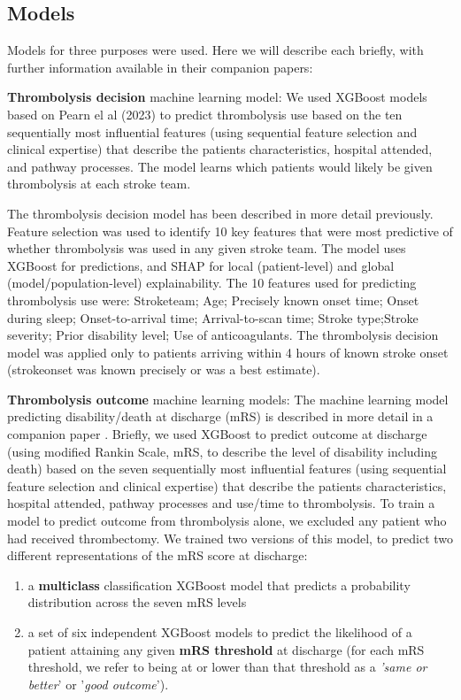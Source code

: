\subsection{Models}

Models for three purposes were used. Here we will describe each briefly, with further information available in their companion papers:

\textbf{Thrombolysis decision} machine learning model: We used XGBoost \cite{chen_xgboost_2016} models based on Pearn el al (2023) \cite{pearn_what_2023} to predict thrombolysis use based on the ten sequentially most influential features (using sequential feature selection and clinical expertise) that describe the patients characteristics, hospital attended, and pathway processes. The model learns which patients would likely be given thrombolysis at each stroke team.


The thrombolysis decision model has been described in more detail previously\cite{pearn_what_2023}. Feature selection was used to identify 10 key features that were most predictive of whether thrombolysis was used in any given stroke team. The model uses XGBoost for predictions, and SHAP for local (patient-level) and global (model/population-level) explainability. The 10 features used for predicting thrombolysis use were: Stroketeam; Age; Precisely known onset time; Onset during sleep; Onset-to-arrival time; Arrival-to-scan time; Stroke type;Stroke severity; Prior disability level; Use of anticoagulants. The thrombolysis decision model was applied only to patients arriving within 4 hours of known stroke onset (strokeonset was known precisely or was a best estimate). 

\textbf{Thrombolysis outcome} machine learning models: The machine learning model predicting disability/death at discharge (mRS) is described in more detail in a companion paper \cite{pearn_are_2024}. Briefly, we used XGBoost \cite{chen_xgboost_2016} to predict outcome at discharge (using modified Rankin Scale, mRS, to describe the level of disability including death) based on the seven sequentially most influential features (using sequential feature selection and clinical expertise) that describe the patients characteristics, hospital attended, pathway processes and use/time to thrombolysis. To train a model to predict outcome from thrombolysis alone, we excluded any patient who had received thrombectomy. We trained two versions of this model, to predict two different representations of the mRS score at discharge: 
\begin{enumerate}
    \item a \textbf{multiclass} classification XGBoost model that predicts a probability distribution across the seven mRS levels
    \item a set of six independent XGBoost models to predict the likelihood of a patient attaining any given \textbf{mRS threshold} at discharge (for each mRS threshold, we refer to being at or lower than that threshold as a \textit{'same or better}' or '\textit{good outcome}'). 
\end{enumerate}

